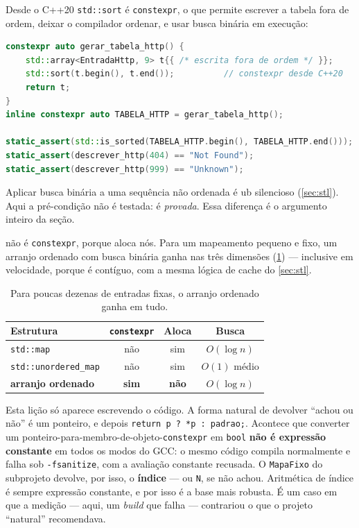Desde o C++20 \texttt{std::sort} é \texttt{constexpr}, o que permite escrever a
tabela fora de ordem, deixar o compilador ordenar, e usar busca binária em
execução:

\begin{lstlisting}[style=bt, language=C++,
    caption={A pré-condição da busca binária, provada em vez de testada.}]
constexpr auto gerar_tabela_http() {
    std::array<EntradaHttp, 9> t{{ /* escrita fora de ordem */ }};
    std::sort(t.begin(), t.end());          // constexpr desde C++20
    return t;
}
inline constexpr auto TABELA_HTTP = gerar_tabela_http();

static_assert(std::is_sorted(TABELA_HTTP.begin(), TABELA_HTTP.end()));
static_assert(descrever_http(404) == "Not Found");
static_assert(descrever_http(999) == "Unknown");
\end{lstlisting}

Aplicar busca binária a uma sequência não ordenada é \gls{ub} silencioso
(\cref{sec:stl}). Aqui a pré-condição não é testada: é \emph{provada}. Essa
diferença é o argumento inteiro da seção.

 não é \texttt{constexpr}, porque aloca nós. Para um mapeamento
pequeno e fixo, um arranjo ordenado com busca binária ganha nas três dimensões
(\cref{tab:mapa-fixo}) --- inclusive em velocidade, porque é contíguo, com a
mesma lógica de cache do \cref{sec:stl}.

\begin{table}[htbp]
\centering
\caption{Para poucas dezenas de entradas fixas, o arranjo ordenado ganha em tudo.}
\label{tab:mapa-fixo}
\footnotesize
\begin{tabular}{@{}lccc@{}}
\toprule
\textbf{Estrutura} & \texttt{constexpr} & \textbf{Aloca} & \textbf{Busca} \\
\midrule
\texttt{std::map}            & não          & sim          & $O(\log n)$ \\
\texttt{std::unordered\_map} & não          & sim          & $O(1)$ médio \\
\textbf{arranjo ordenado}    & \textbf{sim} & \textbf{não} & $O(\log n)$ \\
\bottomrule
\end{tabular}
\end{table}

\begin{armadilha}
Esta lição só aparece escrevendo o código. A forma natural de devolver ``achou
ou não'' é um ponteiro, e depois \texttt{return p ? *p : padrao;}. Acontece que
converter um ponteiro-para-membro-de-objeto-\texttt{constexpr} em \texttt{bool}
\textbf{não é expressão constante} em todos os modos do GCC: o mesmo código
compila normalmente e falha sob \texttt{-fsanitize}, com a avaliação constante
recusada. O \texttt{MapaFixo} do subprojeto devolve, por isso, o
\textbf{índice} --- ou \texttt{N}, se não achou. Aritmética de índice é sempre
expressão constante, e por isso é a base mais robusta. É um caso em que a
medição --- aqui, um \emph{build} que falha --- contrariou o que o projeto
``natural'' recomendava.
\end{armadilha}

